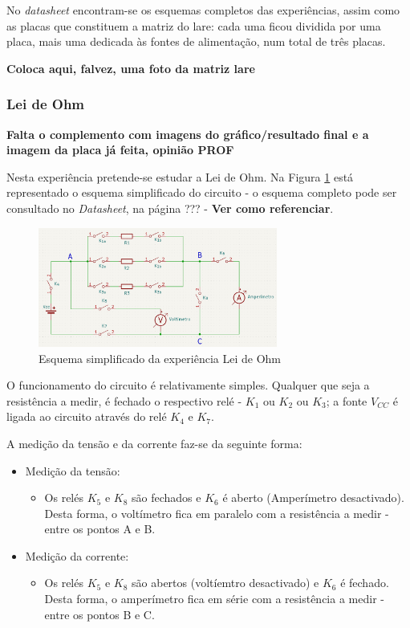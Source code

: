 No \textit{datasheet} encontram-se os esquemas completos das experiências, assim como as placas que constituem a matriz do \acrshort{lare}: cada uma ficou dividida por uma placa, mais uma dedicada às fontes de alimentação, num total de três placas. 

\textbf{Coloca aqui, falvez, uma foto da matriz lare}

\subsubsection{Lei de Ohm}
\label{sec:lei_ohm}
\textbf{Falta o complemento com imagens do gráfico/resultado final e a imagem da placa já feita, opinião PROF}

Nesta experiência pretende-se estudar a Lei de Ohm. Na Figura \ref{fig:esq_geral_ohm} está representado o esquema simplificado do circuito - o esquema completo pode ser consultado no \textit{Datasheet}, na página ??? - \textbf{Ver como referenciar}.

\begin{figure}[hbtp]
	\centering
	\includegraphics[width=0.7\textwidth]{figures/esquema_simplificado_OHM.png}
	\caption{Esquema simplificado da experiência Lei de Ohm}
	\label{fig:esq_geral_ohm}
\end{figure}

O funcionamento do circuito é relativamente simples. Qualquer que seja a resistência a medir, é fechado o respectivo relé - $K_{1}$ ou $K_{2}$ ou $K_{3}$; a fonte $V_{CC}$ é ligada ao circuito através do relé $K_{4}$ e $K_{7}$.

A medição da tensão e da corrente faz-se da seguinte forma:
\begin{itemize}
	\item Medição da tensão:
	      \begin{itemize}
		      \item Os relés $K_{5}$ e $K_{8}$ são fechados e $K_{6}$ é aberto (Amperímetro desactivado). Desta forma, o voltímetro fica em paralelo com a resistência a medir - entre os pontos A e B.
	      \end{itemize}
	\item Medição da corrente:
	      \begin{itemize}
		      \item Os relés $K_{5}$ e $K_{8}$ são abertos (voltíemtro desactivado) e $K_{6}$ é fechado. Desta forma, o amperímetro fica em série com a resistência a medir - entre os pontos B e C.
	      \end{itemize}
\end{itemize}

